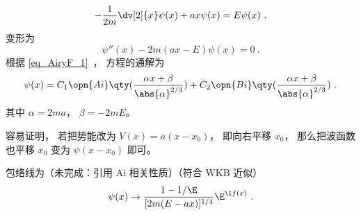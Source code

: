 
\begin{issues}
\issueDraft
\end{issues}


\begin{equation}
-\frac{1}{2m}\dv[2]{x}\psi(x) + ax \psi(x) = E\psi(x)~.
\end{equation}
变形为
\begin{equation}
\psi''(x) - 2m(ax - E)\psi(x) = 0~.
\end{equation}
根据 \autoref{eq_AiryF_1}~， 方程的通解为
\begin{equation}
\psi(x) = C_1\opn{Ai}\qty(\frac{\alpha x+\beta}{\abs{\alpha}^{2/3}}) + C_2 \opn{Bi}\qty(\frac{\alpha x+\beta}{\abs{\alpha}^{2/3}})~.
\end{equation}
其中 $\alpha = 2ma$， $\beta = -2mE$。

容易证明， 若把势能改为 $V(x) = a(x-x_0)$， 即向右平移 $x_0$， 那么把波函数也平移 $x_0$ 变为 $\psi(x-x_0)$ 即可。

包络线为（未完成：引用 Ai 相关性质）（符合 WKB 近似）
\begin{equation}
\psi(x) \to \frac{1-1/\E}{[2m(E-ax)]^{1/4}} \E^{\I f(x)}~.
\end{equation}
